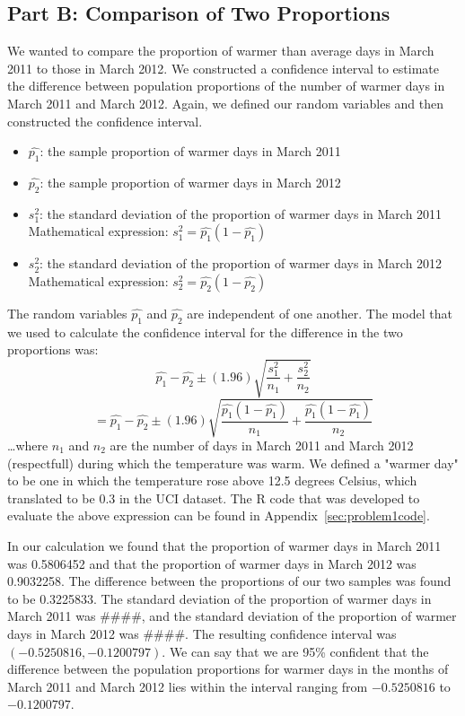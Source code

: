 \documentclass[11pt]{article}
\begin{document}
\subsection{Part B: Comparison of Two Proportions}
\label{subsec:1b}
We wanted to compare the proportion of warmer than average days in March 2011 to those in March 2012. We constructed a confidence interval to estimate the difference between population proportions of the number of warmer days in March 2011 and March 2012. Again, we defined our random variables and then constructed the confidence interval. 
\begin{itemize}
	\item $\hat{p_1}$: the sample proportion of warmer days in March 2011
	\item $\hat{p_2}$: the sample proportion of warmer days in March 2012
	\item $s_{1}^{2}$: the standard deviation of the proportion of warmer days in March 2011
		\subitem Mathematical expression: $s_{1}^{2} =\hat{p_1}(1 - \hat{p_1})$
	\item $s_{2}^{2}$: the standard deviation of the proportion of warmer days in March 2012
		\subitem Mathematical expression: $s_{2}^{2} = \hat{p_2}(1 - \hat{p_2})$
\end{itemize}
The random variables $\hat{p_1}$ and $\hat{p_2}$ are independent of one another. The model that we used to calculate the confidence interval for the difference in the two proportions was:
\begin{equation}
\hat{p_1} - \hat{p_2} \pm (1.96) \sqrt{\frac{s_1^2}{n_1}+\frac{s_2^2}{n_2}} 
\end{equation}
\begin{equation}
= \hat{p_1} - \hat{p_2} \pm (1.96) \sqrt{\frac{\hat{p_1}(1 - \hat{p_1})}{n_1}+\frac{\hat{p_1}(1 - \hat{p_1})}{n_2}}
\end{equation}
\dots where $n_1$ and $n_2$ are the number of days in March 2011 and March 2012 (respectfull) during which the temperature was warm. We defined a "warmer day" to be one in which the temperature rose above 12.5 degrees Celsius, which translated to be 0.3 in the UCI dataset. The R code that was developed to evaluate the above expression can be found in Appendix~\ref{sec:problem1code}.

In our calculation we found that the proportion of warmer days in March 2011 was 0.5806452 and that the proportion of warmer days in March 2012 was 0.9032258. The difference between the proportions of our two samples was found to be 0.3225833. The standard deviation of the proportion of warmer days in March 2011 was \#\#\#\#, and the standard deviation of the proportion of warmer days in March 2012 was \#\#\#\#. The resulting confidence interval was $(-0.5250816, -0.1200797)$. We can say that we are 95\% confident that the difference between the population proportions for warmer days in the months of March 2011 and March 2012 lies within the interval ranging from $-0.5250816$ to  $-0.1200797$.
\end{document}
